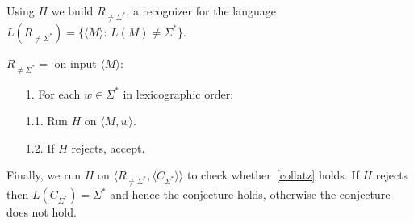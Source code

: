 \documentclass{article}
\newcommand{\st}{\colon\,}
\begin{document}
Using \(H\) we build \(R_{\neq \Sigma^*}\), a recognizer for the language
\(L(R_{\neq \Sigma^*}) = \{\langle M\rangle\st L(M) \neq \Sigma^*\}\).

\(R_{\neq \Sigma^*} =\) on input \(\langle M \rangle\):
\begin{enumerate}
	\item[1.] For each \(w \in \Sigma^*\) in lexicographic order:
	\item[1.1.] Run \(H\) on \(\langle M , w \rangle\).
	\item[1.2.] If \(H\) rejects, accept.
\end{enumerate}

Finally, we run \(H\) on \(\langle R_{\neq \Sigma^*}, \langle C_{\Sigma^*} \rangle
		\rangle\) to check whether~\ref{collatz} holds. If \(H\) rejects then
		\(L(C_{\Sigma^*}) = \Sigma^*\) and hence the conjecture holds, otherwise the
		conjecture does not hold.
\end{document}
